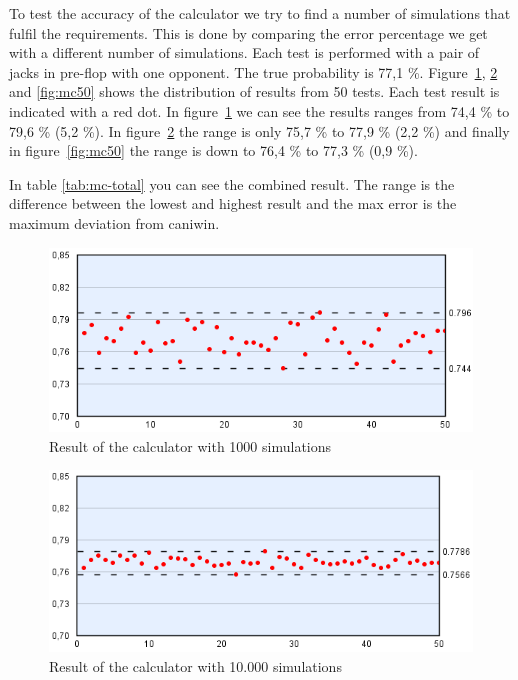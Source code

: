 To test the accuracy of the calculator we try to find a number of simulations that fulfil the requirements. This is done by comparing the error percentage we get with a different number of simulations. Each test is performed with a pair of jacks in pre-flop with one opponent. The true probability is 77,1 \%. Figure~\ref{fig:mc1}, \ref{fig:mc10} and \ref{fig:mc50} shows the distribution of results from 50 tests. Each test result is indicated with a red dot. In figure~\ref{fig:mc1} we can see the results ranges from 74,4 \% to 79,6 \% (5,2 \%). In figure~\ref{fig:mc10} the range is only 75,7 \% to 77,9 \% (2,2 \%) and finally in figure~\ref{fig:mc50} the range is down to 76,4 \% to 77,3 \% (0,9 \%).

In table \ref{tab:mc-total} you can see the combined result. The range is the difference between the lowest and highest result and the max error is the maximum deviation from caniwin.

\begin{figure}[H]
  \center
    \includegraphics[scale=0.775]{images/MonteCarlo/1k.png}
  \caption{Result of the calculator with 1000 simulations \label{fig:mc1}}
\end{figure}

\begin{figure}[H]
  \center
    \includegraphics[scale=0.775]{images/MonteCarlo/10k.png}
  \caption{Result of the calculator with 10.000 simulations \label{fig:mc10}}
\end{figure}

